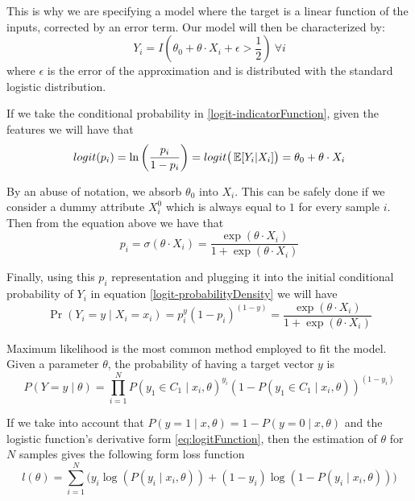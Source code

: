 This is why we are specifying a model where the target is a linear function of the inputs, corrected by an error term. Our model will then be characterized by:
\begin{equation}\label{logit-indicatorFunction}
Y_i = I(\theta_0 + \theta \cdot X_i + \epsilon > \frac{1}{2}) \ \forall i
\end{equation}
where $\epsilon$ is the error of the approximation and is distributed with the standard logistic distribution. %

If we take the conditional probability in \cref{logit-indicatorFunction}, given the features we will have that
\begin{equation}
logit(p_i)= \ln \left(\frac{p_i}{1-p_i} \right) = logit\big( \operatorname{\mathbb{E}}[Y_i| X_i] \big) = \theta_0 + \theta \cdot X_i
\end{equation}

By an abuse of notation, we absorb $\theta_0$ into $X_i$. This can be safely done if we consider a dummy attribute $X_i^0$ which is always equal to $1$ for every sample $i$. Then from the equation above we have that
\begin{equation}
p_i = \sigma(\theta \cdot X_i) = \frac{\exp(\theta \cdot X_i) }{1 + \exp(\theta \cdot X_i)}
\end{equation}

Finally, using this $p_i$ representation and plugging it into the initial conditional probability of $Y_i$ in equation \cref{logit-probabilityDensity} we will have
\begin{equation}
 \Pr(Y_i=y \mid X_i = x_i) = p_i^{y} {(1-p_i)}^{(1-y)} = \frac{\exp(\theta \cdot X_i) }{1 + \exp(\theta \cdot X_i)}
 \end{equation}


Maximum likelihood is the most common method employed to fit the model. %
Given a parameter $\theta$, the probability of having a target vector $y$ is
\begin{equation}
P(Y =y \mid \theta ) = \prod_{i=1}^N {P(y_1 \in C_1 \mid x_i, \theta)}^{y_i} {(1 - P(y_1 \in C_1 \mid x_i, \theta) )}^{(1-y_i)}
\end{equation}

If we take into account that $P(y=1 \mid x,\theta) = 1 - P(y=0 \mid x,\theta)$ and the logistic function's derivative form \cref{eq:logitFunction}, then the estimation of $\theta$ for $N$ samples gives the following form
loss function
\begin{equation}\label{eq:logLossFunction}
l(\theta) = \sum_{i=1}^N \big(y_i \log(P(y_i \mid x_i,\theta)) + (1-y_i)\log(1 - P(y_i \mid x_i,\theta) ) \big)
\end{equation}

